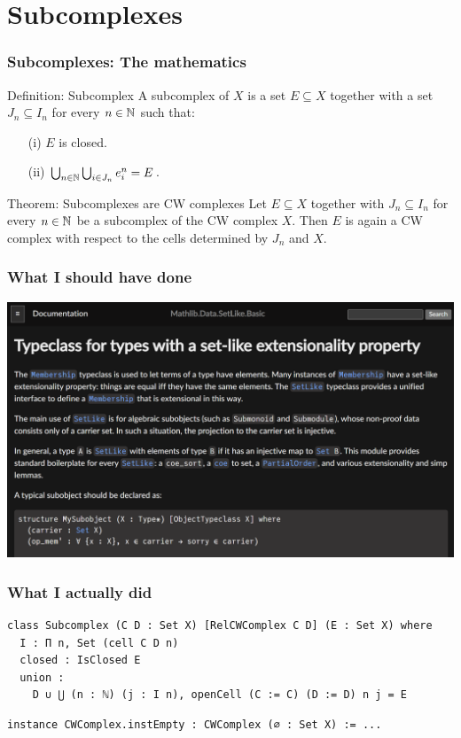\documentclass{beamer}
\begin{document}
\section{Subcomplexes}

\begin{frame}
\frametitle{Subcomplexes: The mathematics}
\begin{block}{Definition: Subcomplex}
  A subcomplex of $X$ is a set $E \subseteq X$ together with a set $J_n \subseteq I_n$ for every $n \in \bN$ such that:
    \begin{enumerate}
        \item[(i)] $E$ is closed.
        \item[(ii)] $\bigcup_{n \in \bN} \bigcup_{i \in J_n} \openCell{n}{i} = E$.
    \end{enumerate}
\end{block}
\begin{block}{Theorem: Subcomplexes are CW complexes}
  Let $E \subseteq X$ together with $J_n \subseteq I_n$ for every $n \in \bN$ be a subcomplex of the CW complex $X$. 
  Then $E$ is again a CW complex with respect to the cells determined by $J_n$ and $X$.
\end{block}
\end{frame}

\begin{frame}
\frametitle{What I should have done}
\includegraphics[width=\textwidth]{SetLikeDocs}
\end{frame}

\begin{frame}[fragile]
\frametitle{What I actually did}
\begin{lstlisting}[basicstyle=\ttfamily\footnotesize]
class Subcomplex (C D : Set X) [RelCWComplex C D] (E : Set X) where
  I : Π n, Set (cell C D n)
  closed : IsClosed E
  union : 
    D ∪ ⋃ (n : ℕ) (j : I n), openCell (C := C) (D := D) n j = E
\end{lstlisting}
\end{frame}

\begin{frame}[fragile]
\begin{lstlisting}
instance CWComplex.instEmpty : CWComplex (∅ : Set X) := ... 


\end{lstlisting}
\end{frame}
\end{document}
